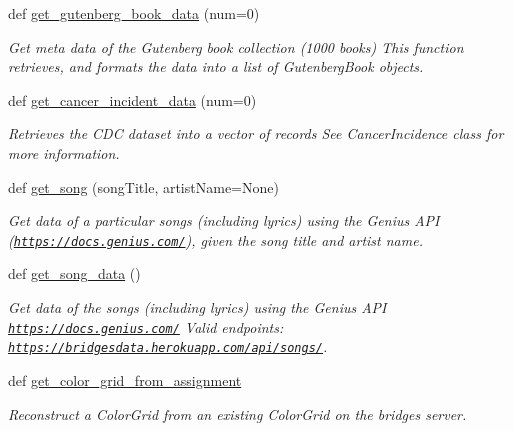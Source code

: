 \begin{DoxyCompactItemize}
def \hyperlink{namespacebridges_1_1data__src__dependent_1_1data__source_af377da50c8f4e488b832978908274089}{get\+\_\+gutenberg\+\_\+book\+\_\+data} (num=0)
\begin{DoxyCompactList}\small\item\em Get meta data of the Gutenberg book collection (1000 books) This function retrieves, and formats the data into a list of Gutenberg\+Book objects. \end{DoxyCompactList}\item 
def \hyperlink{namespacebridges_1_1data__src__dependent_1_1data__source_ac711dee7446daedd503ce0f091a5f85e}{get\+\_\+cancer\+\_\+incident\+\_\+data} (num=0)
\begin{DoxyCompactList}\small\item\em Retrieves the C\+DC dataset into a vector of records See Cancer\+Incidence class for more information. \end{DoxyCompactList}\item 
def \hyperlink{namespacebridges_1_1data__src__dependent_1_1data__source_a060ab8ec1777a5458a37d5e01e594e82}{get\+\_\+song} (song\+Title, artist\+Name=None)
\begin{DoxyCompactList}\small\item\em Get data of a particular songs (including lyrics) using the Genius A\+PI (\href{https://docs.genius.com/}{\tt https\+://docs.\+genius.\+com/}), given the song title and artist name. \end{DoxyCompactList}\item 
def \hyperlink{namespacebridges_1_1data__src__dependent_1_1data__source_abf7f1f53dc13383fa296cb597e4a7ee0}{get\+\_\+song\+\_\+data} ()
\begin{DoxyCompactList}\small\item\em Get data of the songs (including lyrics) using the Genius A\+PI \href{https://docs.genius.com/}{\tt https\+://docs.\+genius.\+com/} Valid endpoints\+: \href{https://bridgesdata.herokuapp.com/api/songs/}{\tt https\+://bridgesdata.\+herokuapp.\+com/api/songs/}. \end{DoxyCompactList}\item 
def \hyperlink{namespacebridges_1_1data__src__dependent_1_1data__source_a87295c22accd698a4573e9f4287c4096}{get\+\_\+color\+\_\+grid\+\_\+from\+\_\+assignment}
\begin{DoxyCompactList}\small\item\em Reconstruct a Color\+Grid from an existing Color\+Grid on the bridges server. \end{DoxyCompactList}\item 

\end{DoxyCompactItemize}
